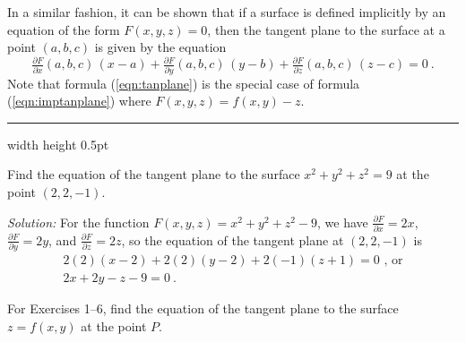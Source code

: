 In a similar fashion, it can be shown that if a surface is defined implicitly by an equation of the form
$F(x,y,z)=0$, then the tangent plane to the surface at a point $(a,b,c)$ is given by the equation
\begin{equation}\label{eqn:imptanplane}
 \tfrac{\partial F}{\partial x}(a,b,c)\,(x-a) + \tfrac{\partial F}{\partial y}(a,b,c)\,(y-b) +
 \tfrac{\partial F}{\partial z}(a,b,c)\,(z-c) = 0 ~.
\end{equation}
Note that formula (\ref{eqn:tanplane}) is the special case of formula (\ref{eqn:imptanplane}) where
$F(x,y,z) = f(x,y) - z$.
\vspace{3mm}
\hrule width \textwidth height 0.5pt
\begin{exmp}
 Find the equation of the tangent plane to the surface $x^2 + y^2 + z^2 = 9$ at the point $(2,2,-1)$.\vspace{1mm}
 \par\noindent \emph{Solution:} For the function $F(x,y,z) = x^2 + y^2 + z^2 - 9$, we have
 $\tfrac{\partial F}{\partial x} = 2x$, $\tfrac{\partial F}{\partial y} = 2y$, and
 $\tfrac{\partial F}{\partial z} = 2z$, so the equation of the tangent plane at $(2,2,-1)$ is
 \begin{gather*}
  2(2)(x-2)+2(2)(y-2)+2(-1)(z+1)=0 \text{~,~or}\\
  2x+2y-z-9=0 ~.
 \end{gather*}
\end{exmp}\vspace{-9mm}
\startexercises\label{sec2dot3}
\par\noindent For Exercises 1--6, find the equation of the tangent plane to the surface $z=f(x,y)$ at the point
$P$.
